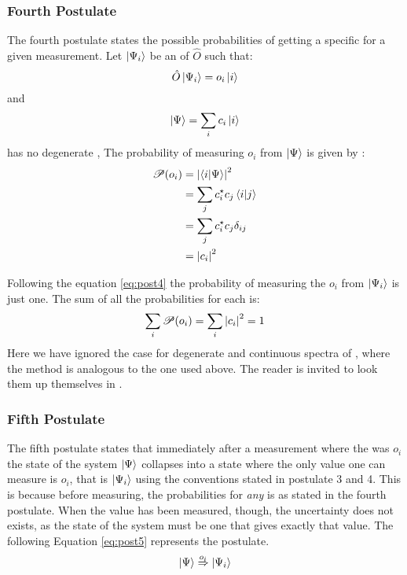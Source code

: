 \documentclass[../master_thesis.tex]{subfiles}
\begin{document}
\subsubsection{Fourth Postulate}
The fourth postulate states the possible probabilities of getting a specific
\eival for a given measurement.
Let $\ket{\Psi_i}$ be an \eifunc of $\hat{O}$ such that:
\begin{equation}
  \hat{O}\ket{\Psi_i} = o_i\ket{i}
\end{equation}
and
\begin{equation}
  \ket{\Psi} = \sum_i c_i \ket{i} \label{eq:lincomb}
\end{equation}
has no degenerate \eival,
The probability of measuring \eival $o_i$ from $\ket{\Psi}$ is given by
\cite{Cohen:1973}:
\begin{align} \label{eq:post4}
  \begin{split}
    \mathscr{P}(o_i) &= \abs{\braket{i|\Psi}}^2\\
                     &= \sum_{j}c_i^\star c_j\braket{i|j}\\
                     &= \sum_{j}c_i^\star c_j\delta_{ij}\\
                     &= \abs{c_i}^2
  \end{split}
\end{align}

Following the equation \ref{eq:post4} the probability of measuring the
\eival $o_i$ from $\ket{\Psi_i}$ is just one. The sum of all the probabilities
for each \eival is:
\begin{equation}
  \sum_i\mathscr{P}(o_i) = \sum_i \abs{c_i}^2 = 1
\end{equation}
Here we have ignored the case for degenerate \eival and continuous spectra of
\eival, where the method is analogous to the one used above. The reader is
invited to look them up themselves in \cite{Cohen:1973, Atkins:2011}.

\subsubsection{Fifth Postulate}
The fifth postulate states that immediately after a measurement where the \eival was $o_i$
the state of the system $\ket{\Psi}$ collapses into a state where the only value one
can measure is $o_i$, that is $ \ket{\Psi_i} $ using the conventions stated in postulate 3 and 4.
This is because before measuring, the probabilities for \textit{any} \eival
is as stated in the fourth postulate. When the value has been measured, though,
the uncertainty does not exists, as the state of the system must be one that gives
exactly that value. The following Equation \ref{eq:post5} represents the postulate.
\begin{equation}\label{eq:post5}
  \ket{\Psi} \stackrel{o_i}{\Rightarrow} \ket{\Psi_i}
\end{equation}
\end{document}
